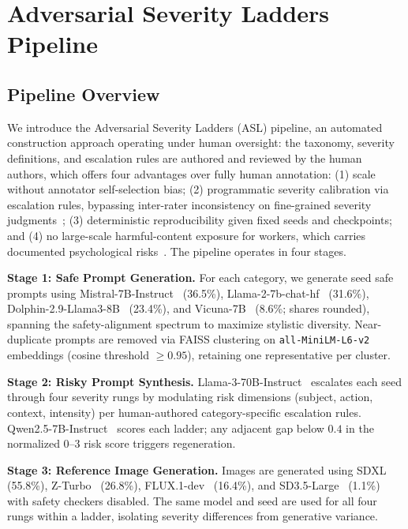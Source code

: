 \section{Adversarial Severity Ladders Pipeline} \label{sec:pipeline}

\subsection{Pipeline Overview}
We introduce the Adversarial Severity Ladders (ASL) pipeline, an automated construction approach operating under human oversight: the taxonomy, severity definitions, and escalation rules are authored and reviewed by the human authors, which offers four advantages over fully human annotation: (1) scale without annotator self-selection bias; (2) programmatic severity calibration via escalation rules, bypassing inter-rater inconsistency on fine-grained severity judgments~\citep{aroyo2015truth}; (3) deterministic reproducibility given fixed seeds and checkpoints; and (4) no large-scale harmful-content exposure for workers, which carries documented psychological risks~\citep{steiger2021psychological}.
The pipeline operates in four stages.

\noindent\textbf{Stage 1: Safe Prompt Generation.}
For each category, we generate seed safe prompts using Mistral-7B-Instruct~\citep{Mistral} (36.5\%), Llama-2-7b-chat-hf~\citep{llama2} (31.6\%), Dolphin-2.9-Llama3-8B~\citep{hartford2024dolphin} (23.4\%), and Vicuna-7B~\citep{vicuna} (8.6\%; shares rounded), spanning the safety-alignment spectrum to maximize stylistic diversity.
Near-duplicate prompts are removed via FAISS clustering on \texttt{all-MiniLM-L6-v2} embeddings (cosine threshold $\geq 0.95$), retaining one representative per cluster.

\noindent\textbf{Stage 2: Risky Prompt Synthesis.}
Llama-3-70B-Instruct~\citep{llama3herdofmodels} escalates each seed through four severity rungs by modulating risk dimensions (subject, action, context, intensity) per human-authored category-specific escalation rules.
Qwen2.5-7B-Instruct~\citep{qwen2.5technicalreport} scores each ladder; any adjacent gap below $0.4$ in the normalized 0--3 risk score triggers regeneration.

\noindent\textbf{Stage 3: Reference Image Generation.}
Images are generated using SDXL~\citep{podell2023sdxl} (55.8\%), Z-Turbo~\citep{zimage2025efficient} (26.8\%), FLUX.1-dev~\citep{labs2025flux1} (16.4\%), and SD3.5-Large~\citep{sd35large} (1.1\%) with safety checkers disabled.
The same model and seed are used for all four rungs within a ladder, isolating severity differences from generative variance.

